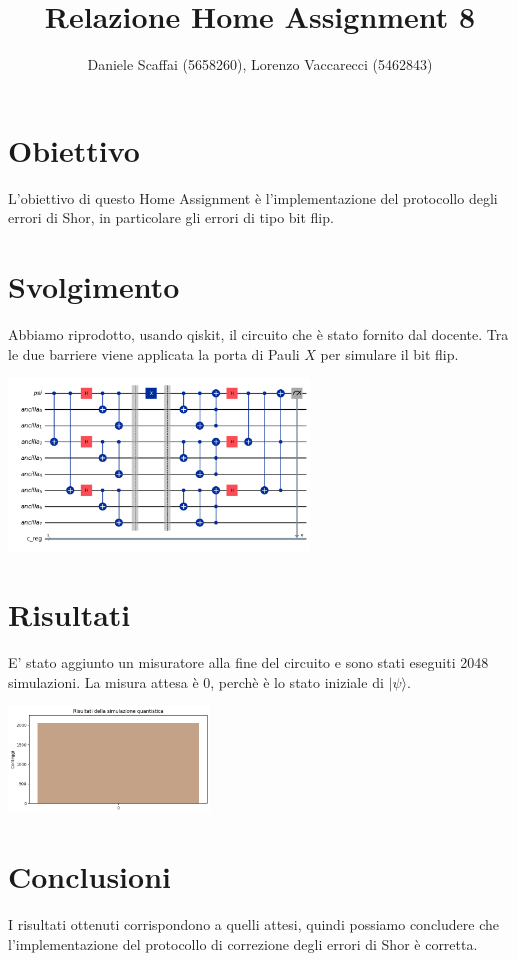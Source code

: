 \documentclass[12pt, a4paper]{article}
\title{Relazione Home Assignment 8}
\author{Daniele Scaffai (5658260), Lorenzo Vaccarecci (5462843)}
\date{}
\newcommand{\ket}[1]{| #1 \rangle}
\begin{document}
\maketitle
\section*{Obiettivo}
L'obiettivo di questo Home Assignment è l'implementazione del protocollo degli errori di Shor, in particolare gli errori di tipo bit flip.

\section*{Svolgimento}
Abbiamo riprodotto, usando qiskit, il circuito che è stato fornito dal docente. Tra le due barriere viene applicata la porta di Pauli $X$ per simulare il bit flip.
   
\begin{center} 
        \includegraphics[width=0.6\textwidth]{img/circuit.png} 
\end{center}

\section*{Risultati}
E' stato aggiunto un misuratore alla fine del circuito e sono stati eseguiti 2048 simulazioni. La misura attesa è 0, perchè è lo stato iniziale di $\ket{\psi}$.
\begin{center} 
    \includegraphics[width=0.4\textwidth]{img/resultsSuccess.png}
\end{center}

\section*{Conclusioni}
I risultati ottenuti corrispondono a quelli attesi, quindi possiamo concludere che l'implementazione del protocollo di correzione degli errori di Shor è corretta.
\end{document}
